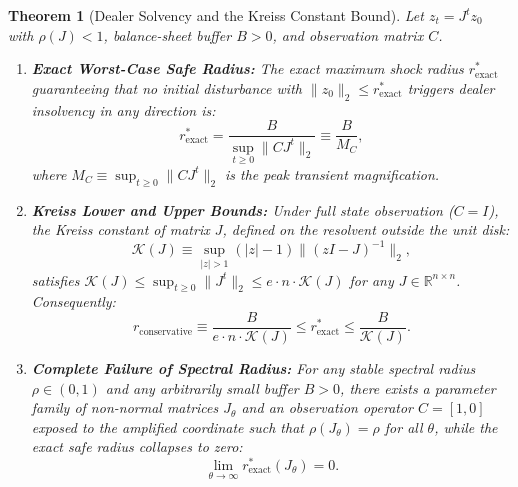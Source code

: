 \documentclass[12pt]{article}
\newtheorem{theorem}{Theorem}[section]
\theoremstyle{definition}
\theoremstyle{remark}
\newcommand{\R}{\mathbb{R}}
\begin{document}
\begin{theorem}[Dealer Solvency and the Kreiss Constant Bound]
\label{thm:m5_kreiss_solvency}
Let $z_t = J^t z_0$ with $\rho(J) < 1$, balance-sheet buffer $B > 0$, and observation matrix $C$.
\begin{enumerate}
    \item \textbf{Exact Worst-Case Safe Radius:} The exact maximum shock radius $r^*_{\text{exact}}$ guaranteeing that no initial disturbance with $\|z_0\|_2 \le r^*_{\text{exact}}$ triggers dealer insolvency in any direction is:
    \begin{equation}
    r^*_{\text{exact}} = \frac{B}{\sup_{t \ge 0} \|C J^t\|_2} \equiv \frac{B}{M_C},
    \label{eq:exact_safe_radius}
    \end{equation}
    where $M_C \equiv \sup_{t \ge 0} \|C J^t\|_2$ is the peak transient magnification.
    \item \textbf{Kreiss Lower and Upper Bounds:} Under full state observation ($C = I$), the Kreiss constant of matrix $J$, defined on the resolvent outside the unit disk:
    \begin{equation}
    \mathcal{K}(J) \equiv \sup_{|z| > 1} (|z| - 1) \|(zI - J)^{-1}\|_2,
    \label{eq:kreiss_def}
    \end{equation}
    satisfies $\mathcal{K}(J) \le \sup_{t \ge 0} \|J^t\|_2 \le e \cdot n \cdot \mathcal{K}(J)$ for any $J \in \R^{n \times n}$. Consequently:
    \begin{equation}
    r_{\text{conservative}} \equiv \frac{B}{e \cdot n \cdot \mathcal{K}(J)} \le r^*_{\text{exact}} \le \frac{B}{\mathcal{K}(J)}.
    \label{eq:kreiss_bilateral_bound}
    \end{equation}
    \item \textbf{Complete Failure of Spectral Radius:} For any stable spectral radius $\rho \in (0, 1)$ and any arbitrarily small buffer $B > 0$, there exists a parameter family of non-normal matrices $J_\theta$ and an observation operator $C = [1, 0]$ exposed to the amplified coordinate such that $\rho(J_\theta) = \rho$ for all $\theta$, while the exact safe radius collapses to zero:
    \begin{equation}
    \lim_{\theta \to \infty} r^*_{\text{exact}}(J_\theta) = 0.
    \end{equation}
\end{enumerate}
\end{theorem}
\end{document}
